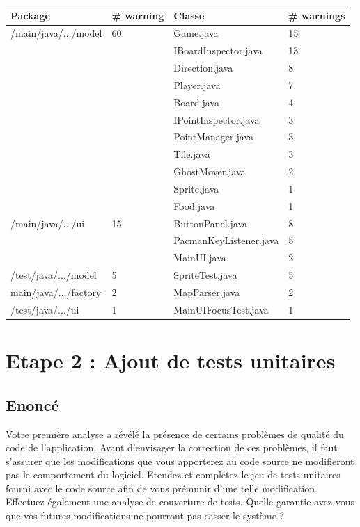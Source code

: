 \documentclass[12pt,a4paper,final]{article}
\begin{document}
\begin{tabular}{|l|l|l|l|}
\hline
Package & \# warning & Classe & \# warnings \\
\hline
/main/java/.../model & 60 & Game.java & 15 \\
&& IBoardInspector.java & 13 \\
&& Direction.java & 8 \\
&& Player.java & 7 \\
&& Board.java & 4 \\
&& IPointInspector.java & 3 \\
&& PointManager.java & 3 \\
&& Tile.java & 3 \\
&& GhostMover.java & 2 \\
&& Sprite.java & 1 \\
&& Food.java & 1 \\
\hline
/main/java/.../ui & 15 & ButtonPanel.java & 8 \\
&& PacmanKeyListener.java & 5 \\
&& MainUI.java & 2 \\
\hline
/test/java/.../model & 5 & SpriteTest.java & 5 \\
\hline
main/java/.../factory & 2 & MapParser.java & 2 \\
\hline
/test/java/.../ui & 1 & MainUIFocusTest.java & 1 \\
\hline
\end{tabular}

\newpage
\section{Etape 2 : Ajout de tests unitaires}\label{sec:etape2}
\subsection{Enoncé}
Votre première analyse a révélé la présence de certains problèmes de qualité du code de l'application.
Avant d'envisager la correction de ces problèmes, il faut s'assurer que les modifications que vous apporterez au code source ne modifieront pas le comportement du logiciel.
Etendez et complétez le jeu de tests unitaires fourni avec le code source afin de vous prémunir d'une telle modification. Effectuez également une analyse de couverture de tests.
Quelle garantie avez-vous que vos futures modifications ne pourront pas casser le système ?
\end{document}
